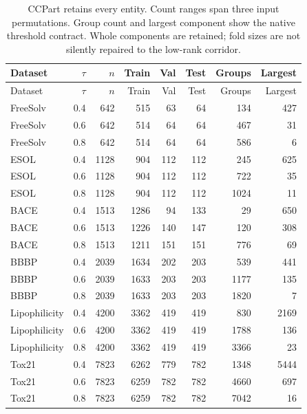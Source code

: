 \begin{longtable}{lrrrrrrr}
\caption{CCPart retains every entity. Count ranges span three input permutations. Group count and largest component show the native threshold contract. Whole components are retained; fold sizes are not silently repaired to the low-rank corridor.}\\
\toprule
Dataset & $\tau$ & $n$ & Train & Val & Test & Groups & Largest\\\midrule
\endfirsthead
\toprule
Dataset & $\tau$ & $n$ & Train & Val & Test & Groups & Largest\\\midrule
\endhead
\midrule\endfoot
\bottomrule\endlastfoot
FreeSolv & 0.4 & 642 & 515 & 63 & 64 & 134 & 427\\
FreeSolv & 0.6 & 642 & 514 & 64 & 64 & 467 & 31\\
FreeSolv & 0.8 & 642 & 514 & 64 & 64 & 586 & 6\\
ESOL & 0.4 & 1128 & 904 & 112 & 112 & 245 & 625\\
ESOL & 0.6 & 1128 & 904 & 112 & 112 & 722 & 35\\
ESOL & 0.8 & 1128 & 904 & 112 & 112 & 1024 & 11\\
BACE & 0.4 & 1513 & 1286 & 94 & 133 & 29 & 650\\
BACE & 0.6 & 1513 & 1226 & 140 & 147 & 120 & 308\\
BACE & 0.8 & 1513 & 1211 & 151 & 151 & 776 & 69\\
BBBP & 0.4 & 2039 & 1634 & 202 & 203 & 539 & 441\\
BBBP & 0.6 & 2039 & 1633 & 203 & 203 & 1177 & 135\\
BBBP & 0.8 & 2039 & 1633 & 203 & 203 & 1820 & 7\\
Lipophilicity & 0.4 & 4200 & 3362 & 419 & 419 & 830 & 2169\\
Lipophilicity & 0.6 & 4200 & 3362 & 419 & 419 & 1788 & 136\\
Lipophilicity & 0.8 & 4200 & 3362 & 419 & 419 & 3366 & 23\\
Tox21 & 0.4 & 7823 & 6262 & 779 & 782 & 1348 & 5444\\
Tox21 & 0.6 & 7823 & 6259 & 782 & 782 & 4660 & 697\\
Tox21 & 0.8 & 7823 & 6259 & 782 & 782 & 7042 & 16\\
\end{longtable}
